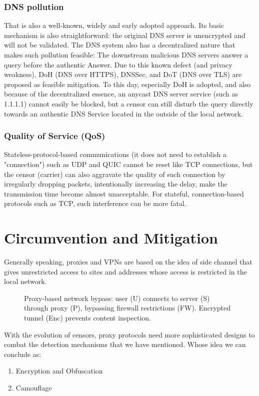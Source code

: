 \documentclass[conference]{IEEEtran}
\begin{document}
\subsubsection{DNS pollution}
That is also a well-known, widely and early adopted approach. Its basic mechanism is also straightforward: the original DNS server is unencrypted and will not be validated. The DNS system also has a decentralized nature that makes such pollution feasible: The downstream malicious DNS servers answer a query before the authentic Answer. 
Due to this known defect (and privacy weakness), DoH (DNS over HTTPS), DNSSec, and DoT (DNS over TLS)  are proposed as feasible mitigation. To this day, especially DoH is adopted, and also because of the decentralized essence, an anycast DNS server service (such as 1.1.1.1) cannot easily be blocked, but a censor can still disturb the query directly towards an authentic DNS Service located in the outside of the local network.

\subsubsection{Quality of Service (QoS)}\label{sec:qos}
Stateless-protocol-based communications (it does not need to establish a "connection") such as UDP and QUIC cannot be reset like TCP connections, but the censor (carrier) can also aggravate the quality of such connection by irregularly dropping packets, intentionally increasing the delay, make the transmission time become almost unacceptable. 
For stateful, connection-based protocols such as TCP, such interference can be more fatal.

\section{Circumvention and Mitigation}\label{section:cam}
Generally speaking, proxies and VPNs are based on the idea of side channel that gives unrestricted access to sites and addresses whose access is restricted in the local network. 

\begin{figure}[!h]
\centering

\caption{Proxy-based network bypass: user (U) connects to server (S) through proxy (P), bypassing firewall restrictions (FW). Encrypted tunnel (Enc) prevents content inspection.}
\label{fig:proxy}
\end{figure}

With the evolution of censors, proxy protocols need more sophisticated designs to combat the detection mechanisms that we have mentioned. Whose idea we can conclude as:
\begin{enumerate}
    \item Encryption and Obfuscation
    \item Camouflage
\end{enumerate}
\end{document}
